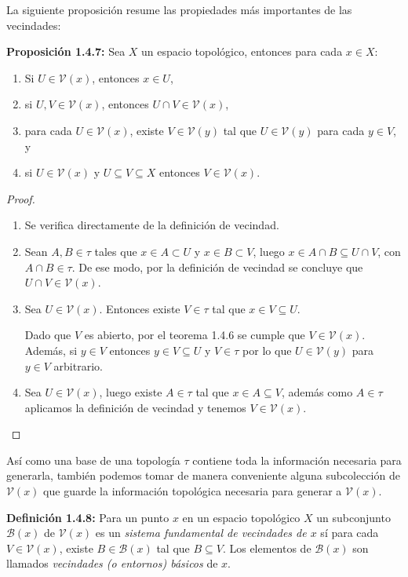 La siguiente proposición resume las propiedades más importantes de las vecindades:

\textbf{Proposición 1.4.7:} Sea $X$ un espacio topológico, entonces para cada $x\in X$:
\begin{enumerate}
    \item Si $U\in\mathcal{V}(x)$, entonces $x\in U$,
    \item si $U,V\in\mathcal{V}(x)$, entonces $U\cap V\in\mathcal{V}(x)$,
    \item para cada $U\in\mathcal{V}(x)$, existe $V\in\mathcal{V}(y)$ tal que $U\in\mathcal{V}(y)$ para cada $y\in V$, y 
    \item si $U\in\mathcal{V}(x)$ y $U\subseteq V\subseteq X$ entonces $V\in\mathcal{V}(x)$.
\end{enumerate}

\begin{proof} $$$$
\begin{enumerate}
    \item Se verifica directamente de la definición de vecindad. 
    \item Sean $A,B\in\tau$ tales que $x\in A\subset U$ y $x\in B\subset V$, luego $x\in A\cap B\subseteq U\cap V$, con $A\cap B\in\tau$. De ese modo, por la definición de vecindad se concluye que $U\cap V\in\mathcal{V}(x)$.
    \item Sea $U\in\mathcal{V}(x)$. Entonces existe $V\in\tau$ tal que $x\in V\subseteq U$.
    
    Dado que $V$ es abierto, por el teorema 1.4.6 se cumple que $V\in\mathcal{V}(x)$. Además, si $y\in V$ entonces $y\in V\subseteq U$ y $V\in\tau$ por lo que $U\in\mathcal{V}(y)$ para $y\in V$ arbitrario.
    \item Sea $U\in\mathcal{V}(x)$, luego existe $A\in\tau$ tal que $x\in A\subseteq V$, además como $A\in\mathcal{\tau}$ aplicamos la definición de vecindad y tenemos $V\in\mathcal{V}(x)$.
\end{enumerate} 
\end{proof}

Así como una base de una topología $\tau$ contiene toda la información necesaria para generarla, también podemos tomar de manera conveniente alguna subcolección de $\mathcal{V}(x)$ que guarde la información topológica necesaria para generar a $\mathcal{V}(x)$.

\textbf{Definición 1.4.8:} Para un punto $x$ en un espacio topológico $X$ un subconjunto $\mathcal{B}(x)$ de $\mathcal{V}(x)$ es un \textit{sistema fundamental de vecindades de $x$} sí para cada $V\in\mathcal{V}(x)$, existe $B\in\mathcal{B}(x)$ tal que $B\subseteq V$. Los elementos de $\mathcal{B}(x)$ son llamados \textit{vecindades (o entornos) básicos} de $x$.

